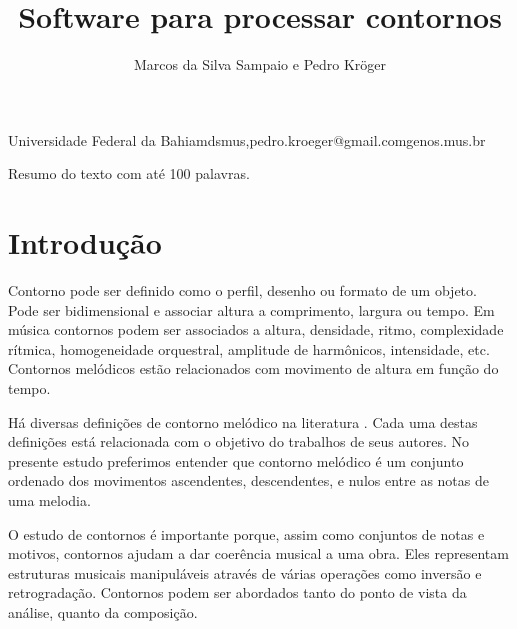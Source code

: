 \documentclass{article}
\begin{document}
\graphicspath{{figs-out/}{out/}}

\title{Software para processar contornos}
\author{Marcos da Silva Sampaio e Pedro Kröger}{Universidade Federal
  da Bahia}{{mdsmus,pedro.kroeger}@gmail.com}{genos.mus.br}

\begin{sumario}
  Resumo do texto com até 100 palavras.  
\end{sumario}








\section{Introdução}
\label{sec:introducao}

Contorno pode ser definido como o perfil, desenho ou formato de um
objeto. Pode ser bidimensional e associar altura a comprimento,
largura ou tempo. Em música contornos podem ser associados a altura,
densidade, ritmo, complexidade rítmica, homogeneidade orquestral,
amplitude de harmônicos, intensidade, etc. Contornos melódicos estão
relacionados com movimento de altura em função do tempo.

Há diversas definições de contorno melódico na literatura
\cite{piston59:harmony,toch77:shaping,schonberg:fundamentals,adams76:melodic,marvin.ea87:relating,morris87:composition,clifford95:contour,beard03:contour}. Cada
uma destas definições está relacionada com o objetivo do trabalhos de
seus autores. No presente estudo preferimos entender que contorno
melódico é um conjunto ordenado dos movimentos ascendentes,
descendentes, e nulos entre as notas de uma melodia.


O estudo de contornos é importante porque, assim como conjuntos de
notas e motivos, contornos ajudam a dar coerência musical a uma
obra. Eles representam estruturas musicais manipuláveis através de
várias operações como inversão e retrogradação. Contornos podem ser
abordados tanto do ponto de vista da análise, quanto da composição.
\end{document}
